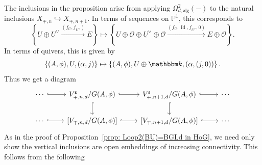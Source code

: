 \message{ !name(Bryan-Vakil.tex)}\documentclass{amsart}
\theoremstyle{definition}
\newcommand{\kk} {{\mathbbm k}}
\newcommand{\PP}{\mathbb{P}}
\newcommand{\OO}{\mathcal{O}}
\newcommand{\UL}[1]{\underline{#1}}
\newcommand{\alg}{\mathsf{alg}}
\newcommand{\stable}{\mathsf{s}}
\newcommand{\LoopTwo}{\Omega^{2}_{d,\alg}}
\newcommand{\Id}{\operatorname{Id}}
\begin{document}
The inclusions in the proposition arise from applying $\LoopTwo (-)$
to the natural inclusions $X_{\mp ,n}\hookrightarrow X_{\mp ,n+1}$. In
terms of sequences on $\PP^{1}$, this corresponds to 
\[
\left\{\UL{U}\oplus \UL{U}^{\vee}\xrightarrow{(f_{U},f_{U^{\vee}})}E
\right\} \mapsto \left\{\UL{U}\oplus \OO \oplus \UL{U}^{\vee}\oplus
\OO  \xrightarrow{(f_{U},\Id ,f_{U^{\vee}},0)}E\oplus \OO  \right\}.
\]
In terms of quivers, this is given by
\[
\left\{(A,\phi ),U,(\alpha ,j) \right\}\mapsto \left\{(A,\phi
),U\oplus \kk ,(\alpha ,(j,0)) \right\}.
\]
Thus we get a diagram
\begin{equation}\label{diag: diagram defining Loop(X+infty) in HoG}
\begin{tikzcd}
    \cdots \arrow[r, hook]
    & V^{\stable}_{\mp ,n,d}/G(A,\phi ) \arrow[r, hook] \arrow[d, hook]
    & V^{\stable}_{\mp ,n+1,d}/G(A,\phi )  \arrow[r, hook] \arrow[d, hook] & \cdots \\
    \cdots \arrow[r, hook]
    & \left[V_{\mp ,n,d}/G(A,\phi ) \right] \arrow[r, hook]
    & \left[V_{\mp, n+1,d}/G(A,\phi ) \right] 
\arrow[r, hook] & \cdots
\end{tikzcd}
\end{equation}
As in the proof of Proposition~\ref{prop: Loop2(BU)=BGLd in HoG}, we
need only show the vertical inclusions are open embeddings of
increasing connectivity. This follows from the following
\end{document}
